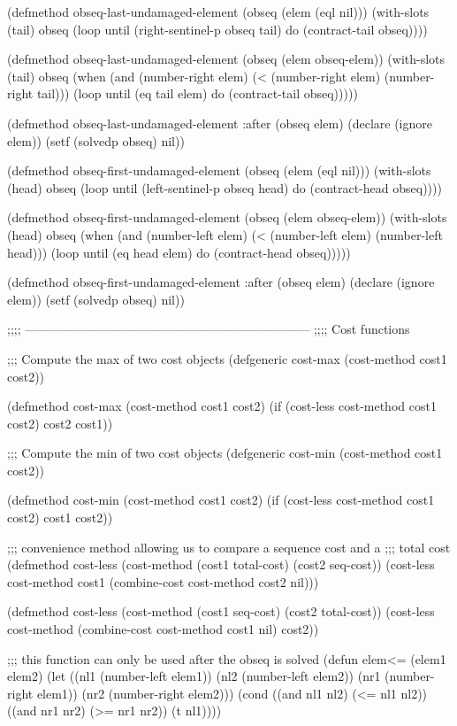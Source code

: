 (defmethod obseq-last-undamaged-element (obseq (elem (eql nil)))
  (with-slots (tail) obseq
    (loop until (right-sentinel-p obseq tail)
	  do (contract-tail obseq))))

(defmethod obseq-last-undamaged-element (obseq (elem obseq-elem))
  (with-slots (tail) obseq
    (when (and (number-right elem)
	       (< (number-right elem)
		  (number-right tail)))
      (loop until (eq tail elem)
	    do (contract-tail obseq)))))
  
(defmethod obseq-last-undamaged-element :after (obseq elem)
  (declare (ignore elem))
  (setf (solvedp obseq) nil))

(defmethod obseq-first-undamaged-element (obseq (elem (eql nil)))
  (with-slots (head) obseq
    (loop until (left-sentinel-p obseq head)
	  do (contract-head obseq))))

(defmethod obseq-first-undamaged-element (obseq (elem obseq-elem))
  (with-slots (head) obseq
    (when (and (number-left elem)
	       (< (number-left elem)
		  (number-left head)))
      (loop until (eq head elem)
	    do (contract-head obseq)))))

(defmethod obseq-first-undamaged-element :after (obseq elem)
  (declare (ignore elem))
  (setf (solvedp obseq) nil))

;;;; ---------------------------------------------------------------------
;;;; Cost functions


;;; Compute the max of two cost objects
(defgeneric cost-max (cost-method cost1 cost2))

(defmethod cost-max (cost-method cost1 cost2)
  (if (cost-less cost-method cost1 cost2) cost2 cost1))

;;; Compute the min of two cost objects
(defgeneric cost-min (cost-method cost1 cost2))

(defmethod cost-min (cost-method cost1 cost2)
  (if (cost-less cost-method cost1 cost2) cost1 cost2))

;;; convenience method allowing us to compare a sequence cost and a
;;; total cost
(defmethod cost-less (cost-method (cost1 total-cost) (cost2 seq-cost))
  (cost-less cost-method cost1 (combine-cost cost-method cost2 nil)))

(defmethod cost-less (cost-method (cost1 seq-cost) (cost2 total-cost))
  (cost-less cost-method (combine-cost cost-method cost1 nil) cost2))

;;; this function can only be used after the obseq is solved
(defun elem<= (elem1 elem2)
  (let ((nl1 (number-left elem1))
	(nl2 (number-left elem2))
	(nr1 (number-right elem1))
	(nr2 (number-right elem2)))
    (cond ((and nl1 nl2) (<= nl1 nl2))
	  ((and nr1 nr2) (>= nr1 nr2))
	  (t nl1))))

